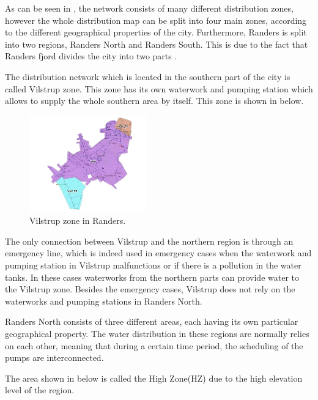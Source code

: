 As can be seen in , the network consists of many different distribution zones, however the whole distribution map can be split into four main zones, according to the different geographical properties of the city. Furthermore, Randers is split into two regions, Randers North and Randers South. This is due to the fact that Randers fjord divides the city into two parts\cite{verdo} . 

The distribution network which is located in the southern part of the city is called Vilstrup zone. This zone has its own waterwork and pumping station which allows to supply the whole southern area by itself. This zone is shown in  below.

\begin{figure}[H]
\centering
\includegraphics[width=0.45\textwidth]{report/pictures/Vilstrup_region}
\caption{Vilstrup zone in Randers.}
\label{fig:vilstrup_region}
\end{figure}

The only connection between Vilstrup and the northern region is through an emergency line, which is indeed used in emergency cases when the waterwork and pumping station in Vilstrup malfunctions or if there is a pollution in the water tanks. In these cases waterworks from the northern parts can provide water to the Vilstrup zone. Besides the emergency cases, Vilstrup does not rely on the waterworks and pumping stations in Randers North.  

Randers North consists of three different areas, each having its own particular geographical property. The water distribution in these regions are normally relies on each other, meaning that during a certain time period, the scheduling of the pumps are interconnected. 

The area shown in  below is called the High Zone(HZ) due to the high elevation level of the region. 

